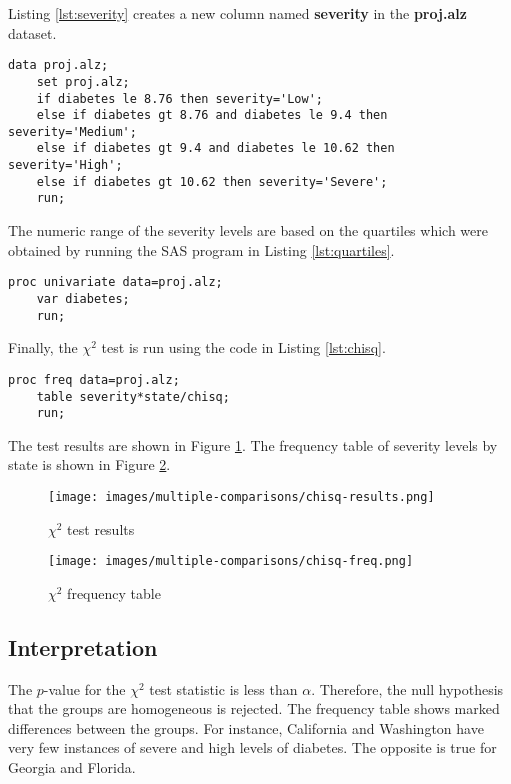 \documentclass{article}
\begin{document}
Listing \ref{lst:severity} creates a new column named \textbf{severity} in the \textbf{proj.alz} dataset. 

\begin{lstlisting}[language=SAS,caption=Adding the severity column to the dataset,captionpos=b,label=lst:severity]
    data proj.alz; 
    set proj.alz; 
    if diabetes le 8.76 then severity='Low'; 
    else if diabetes gt 8.76 and diabetes le 9.4 then severity='Medium'; 
    else if diabetes gt 9.4 and diabetes le 10.62 then severity='High'; 
    else if diabetes gt 10.62 then severity='Severe'; 
    run;
\end{lstlisting}

The numeric range of the severity levels are based on the quartiles which were obtained by running the SAS program in Listing \ref{lst:quartiles}.

\begin{lstlisting}[language=SAS,caption=Obtaining quartiles for the diabetes variable,captionpos=b,label=lst:quartiles]
    proc univariate data=proj.alz;
    var diabetes;
    run;
\end{lstlisting}

Finally, the $\chi^2$ test is run using the code in Listing \ref{lst:chisq}.

\begin{lstlisting}[language=SAS,caption=$\chi^2$ test for homogeneity variable,captionpos=b,label=lst:chisq]
    proc freq data=proj.alz;
    table severity*state/chisq;
    run;
\end{lstlisting}

The test results are shown in Figure \ref{fig:chisq-results}. The frequency table of severity levels by state is shown in Figure \ref{fig:chisq-freq}.

\begin{figure}[ht]
    \centering
    \texttt{[image: images/multiple-comparisons/chisq-results.png]}
    \caption{$\chi^2$ test results}
    \label{fig:chisq-results}
\end{figure}

\begin{figure}[ht]
    \centering
    \texttt{[image: images/multiple-comparisons/chisq-freq.png]}
    \caption{$\chi^2$ frequency table}
    \label{fig:chisq-freq}
\end{figure}

\clearpage

\subsection{Interpretation}
The $p$-value for the $\chi^2$ test statistic is less than $\alpha$. Therefore, the null hypothesis that the groups are homogeneous is rejected. The frequency table shows marked differences between the groups. For instance, California and Washington have very few instances of severe and high levels of diabetes. The opposite is true for Georgia and Florida.
\end{document}

